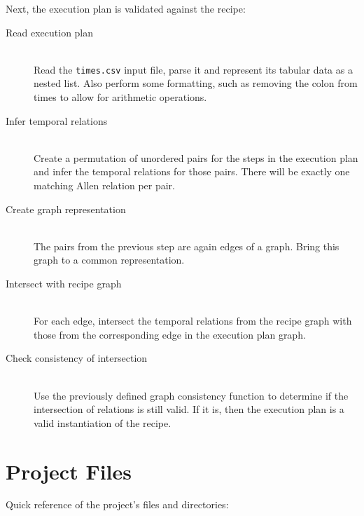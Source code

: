         Next, the execution plan is validated against the recipe:
        
        \begin{description}
            \item[Read execution plan] \hfill \\
                Read the \texttt{times.csv} input file, parse it and represent
                its tabular data as a nested list. Also perform some formatting,
                such as removing the colon from times to allow for arithmetic
                operations.
            \item[Infer temporal relations] \hfill \\
                Create a permutation of unordered pairs for the steps in the
                execution plan and infer the temporal relations for those pairs.
                There will be exactly one matching Allen relation per pair.
            \item[Create graph representation] \hfill \\
                The pairs from the previous step are again edges of a graph.
                Bring this graph to a common representation.
            \item[Intersect with recipe graph] \hfill \\
                For each edge, intersect the temporal relations from the recipe
                graph with those from the corresponding edge in the execution
                plan graph.
            \item[Check consistency of intersection] \hfill \\
                Use the previously defined graph consistency function to
                determine if the intersection of relations is still valid. If it
                is, then the execution plan is a valid instantiation of the
                recipe.
        \end{description}
    
    \section{Project Files}
    
        Quick reference of the project's files and directories:
        
